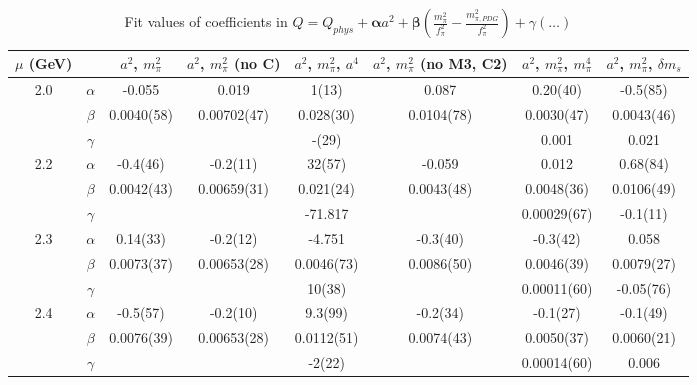 \documentclass[12pt]{extarticle}
\begin{document}
\begin{table}[h!]
\begin{center}
\begin{tabular}{|c c|c|c|c|c|c|c|}
\hline
$\mu$ (GeV) &  & $a^2$, $m_\pi^2$& $a^2$, $m_\pi^2$ (no C)& $a^2$, $m_\pi^2$, $a^4$& $a^2$, $m_\pi^2$ (no M3, C2)& $a^2$, $m_\pi^2$, $m_\pi^4$& $a^2$, $m_\pi^2$, $\delta m_s$\\
\hline
\multirow{3}{0.5in}{2.0} & $\alpha$ & -0.055& 0.019& 1(13)& 0.087& 0.20(40)& -0.5(85)\\
 & $\beta$ & 0.0040(58)& 0.00702(47)& 0.028(30)& 0.0104(78)& 0.0030(47)& 0.0043(46)\\
 & $\gamma$ &  &  & -(29)&  & 0.001& 0.021\\
\hline
\multirow{3}{0.5in}{2.2} & $\alpha$ & -0.4(46)& -0.2(11)& 32(57)& -0.059& 0.012& 0.68(84)\\
 & $\beta$ & 0.0042(43)& 0.00659(31)& 0.021(24)& 0.0043(48)& 0.0048(36)& 0.0106(49)\\
 & $\gamma$ &  &  & -71.817&  & 0.00029(67)& -0.1(11)\\
\hline
\multirow{3}{0.5in}{2.3} & $\alpha$ & 0.14(33)& -0.2(12)& -4.751& -0.3(40)& -0.3(42)& 0.058\\
 & $\beta$ & 0.0073(37)& 0.00653(28)& 0.0046(73)& 0.0086(50)& 0.0046(39)& 0.0079(27)\\
 & $\gamma$ &  &  & 10(38)&  & 0.00011(60)& -0.05(76)\\
\hline
\multirow{3}{0.5in}{2.4} & $\alpha$ & -0.5(57)& -0.2(10)& 9.3(99)& -0.2(34)& -0.1(27)& -0.1(49)\\
 & $\beta$ & 0.0076(39)& 0.00653(28)& 0.0112(51)& 0.0074(43)& 0.0050(37)& 0.0060(21)\\
 & $\gamma$ &  &  & -2(22)&  & 0.00014(60)& 0.006\\
\hline
\end{tabular}
\caption{Fit values of coefficients in $Q = Q_{phys} + \mathbf{\alpha} a^2 + \mathbf{\beta}\left(\frac{m_\pi^2}{f_\pi^2}-\frac{m_{\pi,PDG}^2}{f_\pi^2}\right) + \gamma(\ldots)$}
\end{center}
\end{table}
























\clearpage
\end{document}
